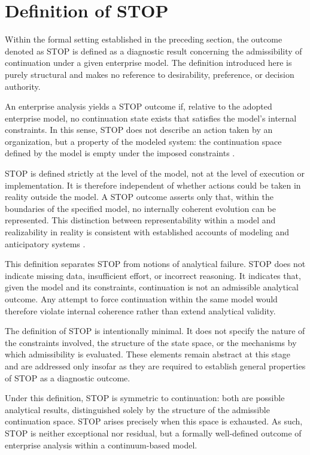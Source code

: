 ﻿\section{Definition of STOP}

Within the formal setting established in the preceding section, the outcome denoted as STOP is defined as a diagnostic result concerning the admissibility of continuation under a given enterprise model. The definition introduced here is purely structural and makes no reference to desirability, preference, or decision authority.

An enterprise analysis yields a STOP outcome if, relative to the adopted enterprise model, no continuation state exists that satisfies the model’s internal constraints. In this sense, STOP does not describe an action taken by an organization, but a property of the modeled system: the continuation space defined by the model is empty under the imposed constraints \cite{ashby1956}.

STOP is defined strictly at the level of the model, not at the level of execution or implementation. It is therefore independent of whether actions could be taken in reality outside the model. A STOP outcome asserts only that, within the boundaries of the specified model, no internally coherent evolution can be represented. This distinction between representability within a model and realizability in reality is consistent with established accounts of modeling and anticipatory systems \cite{rosen1985}.

This definition separates STOP from notions of analytical failure. STOP does not indicate missing data, insufficient effort, or incorrect reasoning. It indicates that, given the model and its constraints, continuation is not an admissible analytical outcome. Any attempt to force continuation within the same model would therefore violate internal coherence rather than extend analytical validity.

The definition of STOP is intentionally minimal. It does not specify the nature of the constraints involved, the structure of the state space, or the mechanisms by which admissibility is evaluated. These elements remain abstract at this stage and are addressed only insofar as they are required to establish general properties of STOP as a diagnostic outcome.

Under this definition, STOP is symmetric to continuation: both are possible analytical results, distinguished solely by the structure of the admissible continuation space. STOP arises precisely when this space is exhausted. As such, STOP is neither exceptional nor residual, but a formally well-defined outcome of enterprise analysis within a continuum-based model.
